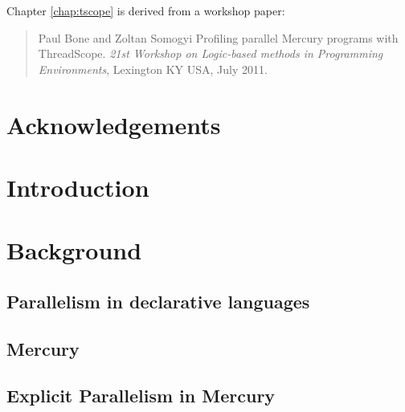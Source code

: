 \documentclass[a4paper,twoside]{report}
\begin{document}

Chapter \ref{chap:tscope} is derived from a workshop paper:

\begin{quote}
Paul Bone and Zoltan Somogyi
Profiling parallel Mercury programs with ThreadScope.
{\em 21st Workshop on Logic-based methods in Programming Environments},
Lexington KY USA, July 2011.
\end{quote}


\chapter*{Acknowledgements}

\tableofcontents

\listoffigures

\listoftables

\chapter{Introduction}
\label{chap:intro}


\chapter{Background}

\section{Parallelism in declarative languages}
\label{sec:back_par}


\section{Mercury}
\label{sec:back_mercury}


\section{Explicit Parallelism in Mercury}
\label{sec:back_mer_par}

\end{document}

